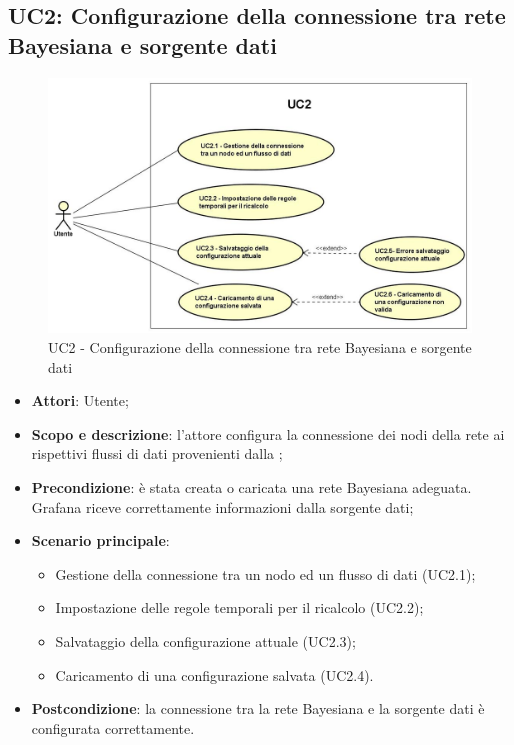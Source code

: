 \subsection{UC2: Configurazione della connessione tra rete Bayesiana e sorgente dati}
\hypertarget{UC2}{}
\begin{figure} [H]
	\centering
	\includegraphics[scale=0.45]{Img/UC2}
	\caption{UC2 - Configurazione della connessione tra rete Bayesiana e sorgente dati}\label{}
\end{figure}
\begin{itemize}
	\item \textbf{Attori}: Utente;
	\item \textbf{Scopo e descrizione}: l'attore configura la connessione dei nodi della rete ai rispettivi flussi di dati provenienti dalla ;
	\item \textbf{Precondizione}: è stata creata o caricata una rete Bayesiana adeguata. Grafana riceve correttamente informazioni dalla sorgente dati;
	\item \textbf{Scenario principale}:
	\begin{itemize}
		\item Gestione della connessione tra un nodo ed un flusso di dati (UC2.1);
		\item Impostazione delle regole temporali per il ricalcolo (UC2.2);
		\item Salvataggio della configurazione attuale (UC2.3);
		\item Caricamento di una configurazione salvata (UC2.4).
	\end{itemize}
	\item \textbf{Postcondizione}: la connessione tra la rete Bayesiana e la sorgente dati è configurata correttamente.
\end{itemize}

